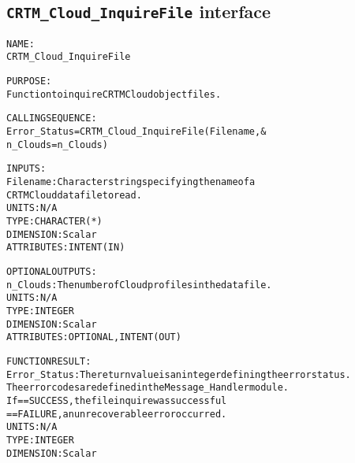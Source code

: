 \subsection{\texttt{CRTM\_Cloud\_InquireFile} interface}
  \label{sec:CRTM_Cloud_InquireFile_interface}
  \begin{alltt}
 
  NAME:
        CRTM_Cloud_InquireFile
 
  PURPOSE:
        Function to inquire CRTM Cloud object files.
 
  CALLING SEQUENCE:
        Error_Status = CRTM_Cloud_InquireFile( Filename           , &
                                               n_Clouds = n_Clouds  )
 
  INPUTS:
        Filename:       Character string specifying the name of a
                        CRTM Cloud data file to read.
                        UNITS:      N/A
                        TYPE:       CHARACTER(*)
                        DIMENSION:  Scalar
                        ATTRIBUTES: INTENT(IN)
 
  OPTIONAL OUTPUTS:
        n_Clouds:       The number of Cloud profiles in the data file.
                        UNITS:      N/A
                        TYPE:       INTEGER
                        DIMENSION:  Scalar
                        ATTRIBUTES: OPTIONAL, INTENT(OUT)
 
  FUNCTION RESULT:
        Error_Status:   The return value is an integer defining the error status.
                        The error codes are defined in the Message_Handler module.
                        If == SUCCESS, the file inquire was successful
                           == FAILURE, an unrecoverable error occurred.
                        UNITS:      N/A
                        TYPE:       INTEGER
                        DIMENSION:  Scalar
 
  \end{alltt}
